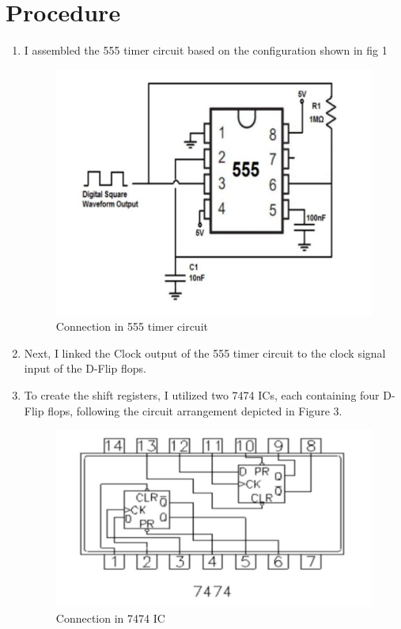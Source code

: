 \documentclass[journal,12pt,twocolumn]{IEEEtran}
\begin{document}
\section{Procedure}
\begin{enumerate}
	\item I assembled the 555 timer circuit based on the configuration shown in fig 1 
	\begin{figure}[h]
	\begin{center}
		\includegraphics[width=\linewidth]{images/555_timer_circuit.jpg}
		\caption{Connection in 555 timer circuit}
		\label{555_t_c}
		\end{center}
	\end{figure}
	
	\item Next, I linked the Clock output of the 555 timer circuit to the clock signal input of the D-Flip flops.
	
	\item To create the shift registers, I utilized two 7474 ICs, each containing four D-Flip flops, following the circuit arrangement depicted in Figure 3.
	\begin{figure}[h]
	\begin{center}
		\includegraphics[width=\linewidth]{images/7474.jpg}
		\caption{Connection in 7474 IC}
		\label{7474_IC}
		\end{center}
	\end{figure}


\end{enumerate}
\end{document}
